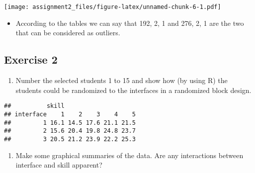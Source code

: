 \documentclass[]{article}
\newenvironment{Shaded}{\begin{snugshade}}{\end{snugshade}}
\newcommand{\CommentTok}[1]{\textcolor[rgb]{0.56,0.35,0.01}{\textit{#1}}}
\newcommand{\DataTypeTok}[1]{\textcolor[rgb]{0.13,0.29,0.53}{#1}}
\newcommand{\DecValTok}[1]{\textcolor[rgb]{0.00,0.00,0.81}{#1}}
\newcommand{\KeywordTok}[1]{\textcolor[rgb]{0.13,0.29,0.53}{\textbf{#1}}}
\newcommand{\NormalTok}[1]{#1}
\newcommand{\OperatorTok}[1]{\textcolor[rgb]{0.81,0.36,0.00}{\textbf{#1}}}
\providecommand{\tightlist}{%
  \setlength{\itemsep}{0pt}\setlength{\parskip}{0pt}}
\begin{document}
\texttt{[image: assignment2\_files/figure-latex/unnamed-chunk-6-1.pdf]}

\begin{itemize}
\tightlist
\item
  According to the tables we can say that 192, 2, 1 and 276, 2, 1 are
  the two that can be considered as outliers.
\end{itemize}

\hypertarget{exercise-2}{%
\subsection{Exercise 2}\label{exercise-2}}

\begin{enumerate}
\def\labelenumi{\alph{enumi})}
\tightlist
\item
  Number the selected students 1 to 15 and show how (by using R) the
  students could be randomized to the interfaces in a randomized block
  design.
\end{enumerate}

\begin{Shaded}
\end{Shaded}

\begin{verbatim}
##          skill
## interface    1    2    3    4    5
##         1 16.1 14.5 17.6 21.1 21.5
##         2 15.6 20.4 19.8 24.8 23.7
##         3 20.5 21.2 23.9 22.2 25.3
\end{verbatim}

\begin{enumerate}
\def\labelenumi{\alph{enumi})}
\setcounter{enumi}{1}
\tightlist
\item
  Make some graphical summaries of the data. Are any interactions
  between interface and skill apparent?
\end{enumerate}

\begin{Shaded}
\end{Shaded}
\end{document}
